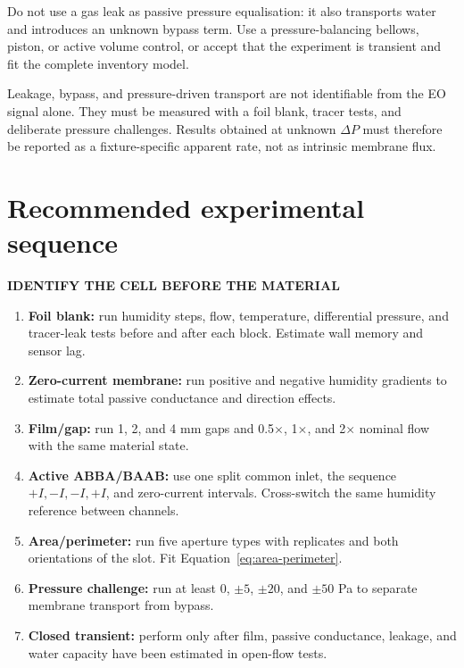 \documentclass[10pt,a4paper]{article}
\newcommand{\eyebrow}[1]{{\sffamily\bfseries\small\color{Teal}\MakeUppercase{#1}}}
\begin{document}
\begin{warningbox}
Do not use a gas leak as passive pressure equalisation: it also transports
water and introduces an unknown bypass term. Use a pressure-balancing bellows,
piston, or active volume control, or accept that the experiment is transient
and fit the complete inventory model.
\end{warningbox}

Leakage, bypass, and pressure-driven transport are not identifiable from the
EO signal alone. They must be measured with a foil blank, tracer tests, and
deliberate pressure challenges. Results obtained at unknown $\Delta P$ must
therefore be reported as a fixture-specific apparent rate, not as intrinsic
membrane flux.
\FloatBarrier

\section{Recommended experimental sequence}

\eyebrow{Identify the cell before the material}

\begin{enumerate}
  \item \textbf{Foil blank:} run humidity steps, flow, temperature,
  differential pressure, and tracer-leak tests before and after each block.
  Estimate wall memory and sensor lag.
  \item \textbf{Zero-current membrane:} run positive and negative humidity
  gradients to estimate total passive conductance and direction effects.
  \item \textbf{Film/gap:} run 1, 2, and 4 mm gaps and 0.5$\times$,
  1$\times$, and 2$\times$ nominal flow with the same material state.
  \item \textbf{Active ABBA/BAAB:} use one split common inlet, the sequence
  $+I,-I,-I,+I$, and zero-current intervals. Cross-switch the same humidity
  reference between channels.
  \item \textbf{Area/perimeter:} run five aperture types with replicates and
  both orientations of the slot. Fit Equation~\eqref{eq:area-perimeter}.
  \item \textbf{Pressure challenge:} run at least 0, $\pm5$, $\pm20$, and
  $\pm50$ Pa to separate membrane transport from bypass.
  \item \textbf{Closed transient:} perform only after film, passive
  conductance, leakage, and water capacity have been estimated in open-flow
  tests.
\end{enumerate}
\end{document}

